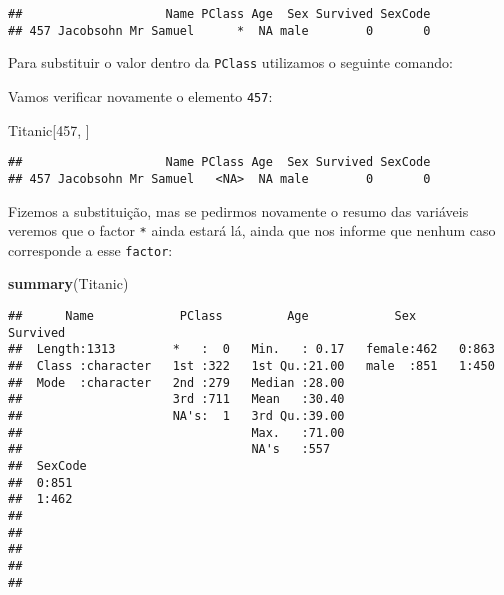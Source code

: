 \documentclass[]{book}
\newenvironment{Shaded}{\begin{snugshade}}{\end{snugshade}}
\newcommand{\DecValTok}[1]{\textcolor[rgb]{0.00,0.00,0.81}{#1}}
\newcommand{\KeywordTok}[1]{\textcolor[rgb]{0.13,0.29,0.53}{\textbf{#1}}}
\newcommand{\NormalTok}[1]{#1}
\newcommand{\OperatorTok}[1]{\textcolor[rgb]{0.81,0.36,0.00}{\textbf{#1}}}
\newcommand{\OtherTok}[1]{\textcolor[rgb]{0.56,0.35,0.01}{#1}}
\newcommand{\StringTok}[1]{\textcolor[rgb]{0.31,0.60,0.02}{#1}}
\theoremstyle{definition}
\theoremstyle{definition}
\theoremstyle{definition}
\theoremstyle{remark}
\begin{document}
\begin{verbatim}
##                    Name PClass Age  Sex Survived SexCode
## 457 Jacobsohn Mr Samuel      *  NA male        0       0
\end{verbatim}

Para substituir o valor dentro da \texttt{PClass} utilizamos o seguinte comando:

\begin{Shaded}
\end{Shaded}

Vamos verificar novamente o elemento \texttt{457}:

\begin{Shaded}
\begin{Highlighting}[]
\NormalTok{Titanic[}\DecValTok{457}\NormalTok{, ]}
\end{Highlighting}
\end{Shaded}

\begin{verbatim}
##                    Name PClass Age  Sex Survived SexCode
## 457 Jacobsohn Mr Samuel   <NA>  NA male        0       0
\end{verbatim}

Fizemos a substituição, mas se pedirmos novamente o resumo das variáveis veremos que o factor \texttt{*} ainda estará lá, ainda que nos informe que nenhum caso corresponde a esse \texttt{factor}:

\begin{Shaded}
\begin{Highlighting}[]
\KeywordTok{summary}\NormalTok{(Titanic)}
\end{Highlighting}
\end{Shaded}

\begin{verbatim}
##      Name            PClass         Age            Sex      Survived
##  Length:1313        *   :  0   Min.   : 0.17   female:462   0:863   
##  Class :character   1st :322   1st Qu.:21.00   male  :851   1:450   
##  Mode  :character   2nd :279   Median :28.00                        
##                     3rd :711   Mean   :30.40                        
##                     NA's:  1   3rd Qu.:39.00                        
##                                Max.   :71.00                        
##                                NA's   :557                          
##  SexCode
##  0:851  
##  1:462  
##         
##         
##         
##         
## 
\end{verbatim}
\end{document}
